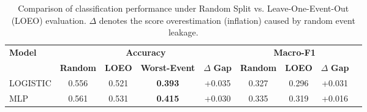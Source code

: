 \begin{table}[t]
\centering
\small
\caption{Comparison of classification performance under Random Split vs. Leave-One-Event-Out (LOEO) evaluation. $\Delta$ denotes the score overestimation (inflation) caused by random event leakage.}
\label{tab:random_vs_loeo}
\begin{tabular}{lcccccccc}
\toprule
\textbf{Model} & \multicolumn{4}{c}{\textbf{Accuracy}} & \multicolumn{3}{c}{\textbf{Macro-F1}} \\
\cmidrule(lr){2-5} \cmidrule(lr){6-8}
 & \textbf{Random} & \textbf{LOEO} & \textbf{Worst-Event} & $\Delta$ \textbf{Gap} & \textbf{Random} & \textbf{LOEO} & $\Delta$ \textbf{Gap} \\
\midrule
LOGISTIC & 0.556 & 0.521 & \textbf{0.393} & +0.035 & 0.327 & 0.296 & +0.031 \\
MLP & 0.561 & 0.531 & \textbf{0.415} & +0.030 & 0.335 & 0.319 & +0.016 \\
\bottomrule
\end{tabular}
\end{table}
